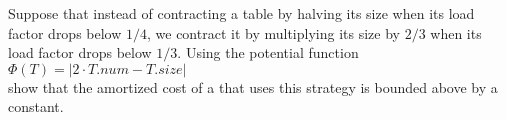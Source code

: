 Suppose that instead of contracting a table by halving its size 
when its load factor drops below $1/4$, we contract it by multiplying 
its size by $2/3$ when its load factor drops below $1/3$. Using the 
potential function\\
$\Phi(T) = | 2\cdot T.num - T.size|$\\
show that the amortized cost of a  that uses 
this strategy is bounded above by a constant.